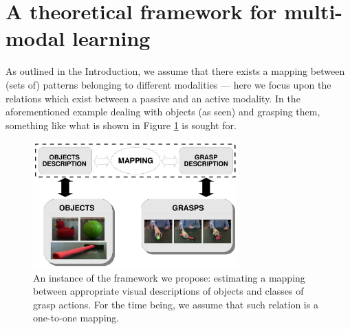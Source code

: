 \section{A theoretical framework for multi-modal learning}
\label{sec::framework}

As outlined in the Introduction, we assume that there exists a mapping between (sets of) patterns belonging to different modalities --- here we focus upon the relations which exist between a passive and an active modality. In the aforementioned example dealing with objects (as seen) and grasping them, something like what is shown in Figure \ref{fig::implementation} is sought for.

\begin{figure}[h!]
	\centering
	\includegraphics[width=0.7\textwidth]{images_pdf/images/schema_implementazione}
	\caption{An instance of the framework we propose: estimating a
     mapping between appropriate visual descriptions of objects and
     classes of grasp actions. For the time being, we assume that such
     relation is a one-to-one mapping.}
	\label{fig::implementation}
\end{figure}

